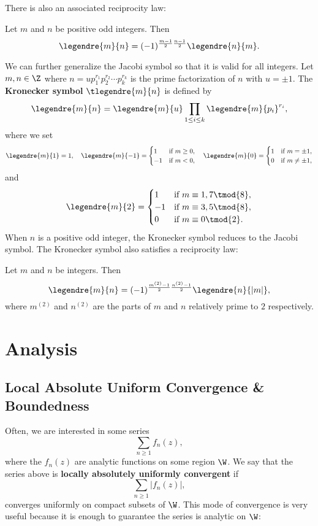     There is also an associated reciprocity law:
    \begin{proposition}
      Let $m$ and $n$ be positive odd integers. Then
      \[
        \legendre{m}{n} = (-1)^{\frac{m-1}{2}\frac{n-1}{2}}\legendre{n}{m}.
      \]
    \end{proposition}
    We can further generalize the Jacobi symbol so that it is valid for all integers. Let $m,n \in \Z$ where $n = up_{1}^{r_{1}}p_{2}^{r_{2}} \cdots p_{k}^{r_{k}}$ is the prime factorization of $n$ with $u = \pm1$. The \textbf{Kronecker symbol} $\tlegendre{m}{n}$ is defined by
    \[
      \legendre{m}{n} = \legendre{m}{u}\prod_{1 \le i \le k}\legendre{m}{p_{i}}^{r_{i}},
    \]
    where we set
    \[
      \legendre{m}{1} = 1, \quad \legendre{m}{-1} = \begin{cases} 1 & \text{if $m \ge 0$}, \\ -1 & \text{if $m < 0$}, \end{cases} \quad \legendre{m}{0} = \begin{cases} 1 & \text{if $m = \pm 1$}, \\ 0 & \text{if $m \neq \pm 1$}, \end{cases}
    \]
    and
    \[
      \legendre{m}{2} = \begin{cases} 1 & \text{if $m \equiv 1,7 \tmod{8}$}, \\ -1 & \text{if $m \equiv 3,5 \tmod{8}$}, \\ 0 & \text{if $m \equiv 0 \tmod{2}$}. \end{cases}
    \]
    When $n$ is a positive odd integer, the Kronecker symbol reduces to the Jacobi symbol. The Kronecker symbol also satisfies a reciprocity law:
    \begin{proposition}
      Let $m$ and $n$ be integers. Then
      \[
        \legendre{m}{n} = (-1)^{\frac{m^{(2)}-1}{2}\frac{n^{(2)}-1}{2}}\legendre{n}{|m|},
      \]
      where $m^{(2)}$ and $n^{(2)}$ are the parts of $m$ and $n$ relatively prime to $2$ respectively.
    \end{proposition}
\chapter{Analysis}
  \section{Local Absolute Uniform Convergence \& Boundedness}
    Often, we are interested in some series
    \[
      \sum_{n \ge 1}f_{n}(z),
    \]
    where the $f_{n}(z)$ are analytic functions on some region $\W$. We say that the series above is \textbf{locally absolutely uniformly convergent} if
    \[
      \sum_{n \ge 1}|f_{n}(z)|,
    \]
    converges uniformly on compact subsets of $\W$. This mode of convergence is very useful because it is enough to guarantee the series is analytic on $\W$:

